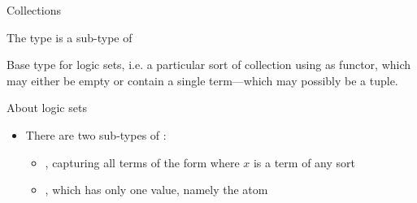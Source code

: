 \documentclass[handout]{beamer}
\begin{document}
\begin{frame}[allowframebreaks]{Collections}

    \framebreak

    \begin{block}{The  type is a sub-type of }
        \begin{center}
            Base type for logic sets, i.e. a particular sort of collection using \pl{\{\}} as functor, which may either be empty or contain a single term---which may possibly be a tuple.
        \end{center}
    \end{block}
    \begin{alertblock}{About logic sets}
        \begin{itemize}
            \item There are two sub-types of :
            \begin{itemize}
                \item \alert{}, capturing all terms of the form  where $x$ is a term of any sort
                \item \alert{}, which has only one value, namely the atom 
            \end{itemize}


\end{itemize}
\end{alertblock}
\end{frame}
\end{document}
